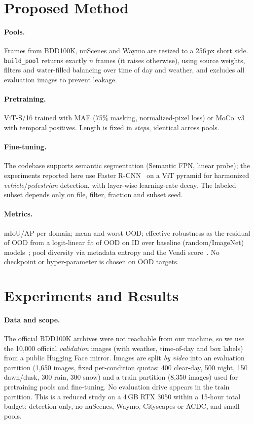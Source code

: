 \documentclass{article}
\begin{document}
\section{Proposed Method}
\paragraph{Pools.} Frames from BDD100K, nuScenes and Waymo are resized to a 256\,px short side. \texttt{build\_pool}
returns exactly $n$ frames (it raises otherwise), using source weights, filters and water-filled balancing over
time of day and weather, and excludes all evaluation images to prevent leakage.
\paragraph{Pretraining.} ViT-S/16 trained with MAE (75\% masking, normalized-pixel loss) or MoCo~v3 with temporal
positives. Length is fixed in \emph{steps}, identical across pools.
\paragraph{Fine-tuning.} The codebase supports semantic segmentation (Semantic FPN, linear probe); the experiments reported here use Faster R-CNN~\cite{ren2015faster}
on a ViT pyramid for harmonized \textit{vehicle}/\textit{pedestrian} detection, with layer-wise learning-rate decay. The labeled
subset depends only on file, filter, fraction and subset seed.
\paragraph{Metrics.} mIoU/AP per domain; mean and worst OOD; effective robustness as the residual of OOD from a
logit-linear fit of OOD on ID over baseline (random/ImageNet) models~\cite{taori2020measuring}; pool diversity via
metadata entropy and the Vendi score~\cite{friedman2023vendi}. No checkpoint or hyper-parameter is chosen on OOD targets.

\section{Experiments and Results}
\paragraph{Data and scope.} The official BDD100K archives were not reachable from our machine, so we use the 10{,}000 official
\emph{validation} images (with weather, time-of-day and box labels) from a public Hugging Face mirror.
Images are split \emph{by video} into an evaluation partition (1{,}650 images, fixed per-condition quotas: 400 clear-day,
500 night, 150 dawn/dusk, 300 rain, 300 snow) and a train partition (8{,}350 images) used for pretraining pools and
fine-tuning. No evaluation drive appears in the train partition. This is a reduced study on a 4\,GB RTX 3050
within a 15-hour total budget: detection only, no nuScenes, Waymo, Cityscapes or ACDC, and small pools.
\end{document}
